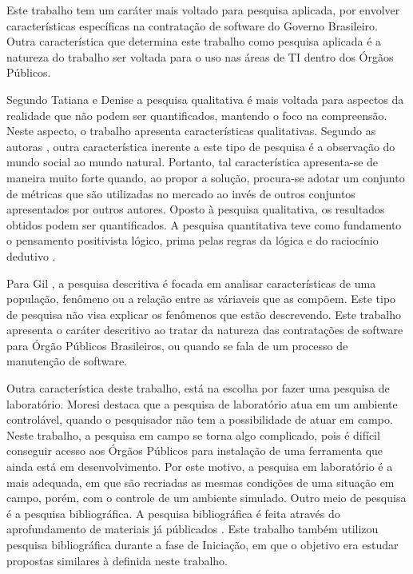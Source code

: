 Este trabalho tem um caráter mais voltado para  pesquisa aplicada, por envolver características específicas na contratação de software do Governo Brasileiro. Outra característica que determina este trabalho como pesquisa aplicada é a natureza do trabalho ser voltada para o uso nas áreas de TI dentro dos Órgãos Públicos.

Segundo Tatiana e Denise \cite{tatiana_denise} a pesquisa qualitativa é mais voltada para aspectos da realidade que não podem ser quantificados, mantendo o foco na compreensão. Neste aspecto, o trabalho apresenta características qualitativas. Segundo as autoras \cite{tatiana_denise}, outra característica inerente a este tipo de pesquisa é a observação do mundo social ao mundo natural. Portanto, tal característica apresenta-se de maneira muito forte quando, ao propor a solução, procura-se adotar um conjunto de métricas que são utilizadas no mercado ao invés de outros conjuntos apresentados por outros autores. Oposto à pesquisa qualitativa, os resultados obtidos podem ser quantificados. A pesquisa quantitativa teve como fundamento o pensamento positivista lógico, prima pelas regras da lógica e do raciocínio dedutivo \cite{tatiana_denise}. 

Para Gil \cite{gil_como_2002}, a pesquisa descritiva é focada em analisar características de uma população, fenômeno ou a relação entre as váriaveis que as compõem. Este tipo de pesquisa não visa explicar os fenômenos que estão descrevendo\cite{moresi_metodologia_2003}. Este trabalho apresenta o caráter descritivo ao tratar da natureza das contratações de software para Órgão Públicos Brasileiros, ou quando se fala de um processo de manutenção de software.

Outra característica deste trabalho, está na escolha por fazer uma pesquisa de laboratório. Moresi destaca que a pesquisa de laboratório atua em um ambiente controlável, quando o pesquisador não tem a possibilidade de atuar em campo. Neste trabalho, a pesquisa em campo se torna algo complicado, pois é difícil conseguir acesso aos Órgãos Públicos para instalação de uma ferramenta que ainda está em desenvolvimento. Por este motivo, a pesquisa em laboratório é a mais adequada, em que são recriadas as mesmas condições de uma situação em campo, porém, com o controle de um ambiente simulado. Outro meio de pesquisa é a pesquisa bibliográfica. A pesquisa bibliográfica é feita através do aprofundamento de materiais já públicados \cite{tatiana_denise}. Este trabalho também utilizou pesquisa bibliográfica durante a fase de Iniciação, em que o objetivo era estudar propostas similares à definida neste trabalho.

